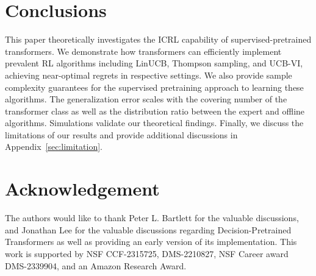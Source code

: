 \documentclass[10pt]{article}
\begin{document}
\section{Conclusions}

This paper theoretically investigates the ICRL capability of supervised-pretrained transformers. We demonstrate how transformers can efficiently implement prevalent RL algorithms including LinUCB, Thompson sampling, and UCB-VI, achieving near-optimal regrets in respective settings. We also provide sample complexity guarantees for the supervised pretraining approach to learning these algorithms. The generalization error scales with the covering number of the transformer class as well as the distribution ratio between the expert and offline algorithms. Simulations validate our theoretical findings.  
Finally, we discuss the limitations of our results and provide additional discussions in Appendix~\ref{sec:limitation}.





\section*{Acknowledgement}

The authors would like to thank Peter L. Bartlett for the valuable discussions, and Jonathan Lee for the valuable discussions regarding Decision-Pretrained Transformers as well as providing an early version of its implementation. This work is supported by NSF CCF-2315725, DMS-2210827, NSF Career award DMS-2339904, and an Amazon Research Award.


\end{document}
